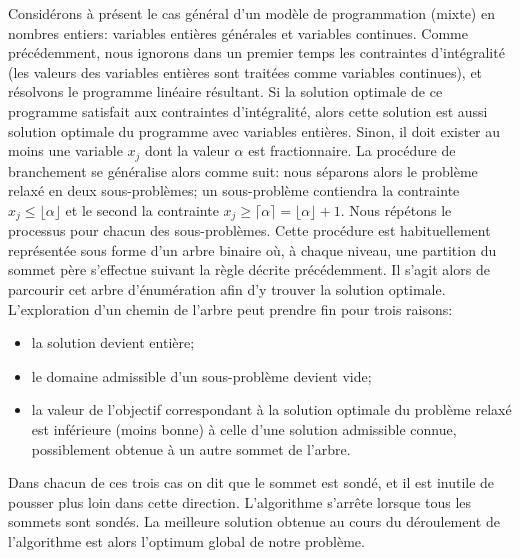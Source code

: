 Considérons à présent le cas général d'un modèle de programmation (mixte) en nombres entiers: variables entières générales et variables continues.
Comme précédemment, nous ignorons dans un premier temps les contraintes d'intégralité (les valeurs des variables entières sont traitées comme variables continues), et résolvons le programme linéaire résultant.
Si la solution optimale de ce programme satisfait aux contraintes d'intégralité, alors cette solution est aussi solution optimale du programme avec variables entières.
Sinon, il doit exister au moins une variable $x_j$ dont la valeur $\alpha$ est fractionnaire.
La procédure de branchement se généralise alors comme suit: nous séparons alors le problème relaxé en deux sous-problèmes;
un sous-problème contiendra la contrainte $x_j \leq \lfloor \alpha \rfloor$ et le second la contrainte $x_j \geq \lceil \alpha \rceil  = \lfloor \alpha \rfloor + 1$.
Nous répétons le processus pour chacun des sous-problèmes.
Cette procédure est habituellement représentée sous forme
d'un arbre binaire où, à chaque niveau, une partition du sommet père s'effectue suivant la règle décrite précédemment.
Il s'agit alors de parcourir cet arbre d'énumération afin d'y trouver la solution optimale.
L'exploration d'un chemin de l'arbre peut prendre fin pour trois raisons:
\begin{itemize}
\item
la solution devient entière;
\item
le domaine admissible d'un sous-problème devient vide;
\item
la valeur de l'objectif correspondant à la solution optimale du problème relaxé est inférieure (moins bonne) à celle d'une solution admissible connue, possiblement obtenue à un autre sommet de l'arbre.
\end{itemize}
Dans chacun de ces trois cas on dit que le sommet est sondé, et il est inutile de pousser plus loin dans cette direction.
L'algorithme s'arrête lorsque tous les sommets sont sondés.
La meilleure solution obtenue au cours du déroulement de l'algorithme est alors l'optimum global de notre problème.

